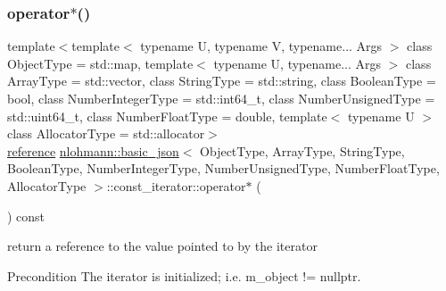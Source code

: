 \subsubsection{\texorpdfstring{operator$\ast$()}{operator*()}}
{\footnotesize\ttfamily template$<$template$<$ typename U, typename V, typename... Args $>$ class Object\+Type = std\+::map, template$<$ typename U, typename... Args $>$ class Array\+Type = std\+::vector, class String\+Type  = std\+::string, class Boolean\+Type  = bool, class Number\+Integer\+Type  = std\+::int64\+\_\+t, class Number\+Unsigned\+Type  = std\+::uint64\+\_\+t, class Number\+Float\+Type  = double, template$<$ typename U $>$ class Allocator\+Type = std\+::allocator$>$ \\
\hyperlink{classnlohmann_1_1basic__json_1_1const__iterator_aefd248cac6493eed1e6ff53ba6a63eb2}{reference} \hyperlink{classnlohmann_1_1basic__json}{nlohmann\+::basic\+\_\+json}$<$ Object\+Type, Array\+Type, String\+Type, Boolean\+Type, Number\+Integer\+Type, Number\+Unsigned\+Type, Number\+Float\+Type, Allocator\+Type $>$\+::const\+\_\+iterator\+::operator$\ast$ (\begin{DoxyParamCaption}{ }\end{DoxyParamCaption}) const\hspace{0.3cm}{\ttfamily [inline]}}



return a reference to the value pointed to by the iterator 

\begin{DoxyPrecond}{Precondition}
The iterator is initialized; i.\+e. {\ttfamily m\+\_\+object != nullptr}. 
\end{DoxyPrecond}
\hypertarget{classnlohmann_1_1basic__json_1_1const__iterator_a7a80257f2303210b0a5d056fc0b30b40}{}\label{classnlohmann_1_1basic__json_1_1const__iterator_a7a80257f2303210b0a5d056fc0b30b40} 
